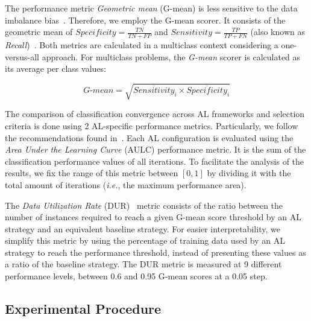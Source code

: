 \documentclass[remotesensing,article,submit,moreauthors,pdftex]{Definitions/mdpi}
\begin{document}
\begin{paracol}{2}
The performance metric \textit{Geometric mean} (G-mean) is less
sensitive to the data imbalance bias~\cite{Jeni2013, Kubat1997}. Therefore, we
employ the G-mean scorer. It consists of the geometric mean of $Specificity =
\frac{TN}{TN + FP}$ and $Sensitivity = \frac{TP}{TP+FN}$ (also known as
\textit{Recall})~\cite{Kubat1997}. Both metrics are calculated in a multiclass
context considering a one-versus-all approach. For multiclass problems, the
\textit{G-mean} scorer is calculated as its average per class values: 
        
\begin{equation*}
    \textit{G-mean} = \sqrt{\overline{Sensitivity}_i \times
    \overline{Specificity}_i}
\end{equation*}
    
The comparison of classification convergence across AL frameworks and
selection criteria is done using 2 AL-specific performance metrics.
Particularly, we follow the recommendations found in~\cite{Kottke2017}. Each
AL configuration is evaluated using the \textit{Area Under the Learning Curve}
(AULC) performance metric. It is the sum of the classification performance
values of all iterations. To facilitate the analysis of the results, we fix
the range of this metric between $[0,1]$ by dividing it with the total amount
of iterations (\textit{i.e.}, the maximum performance area). 

The \textit{Data Utilization Rate} (DUR)~\cite{Reitmaier2013} metric consists
of the ratio between the number of instances required to reach a given G-mean
score threshold by an AL strategy and an equivalent baseline strategy. For
easier interpretability, we simplify this metric by using the percentage
of training data used by an AL strategy to reach the performance threshold,
instead of presenting these values as a ratio of the baseline strategy. The
DUR metric is measured at 9 different performance levels, between
0.6 and 0.95 G-mean scores at a 0.05 step.

\subsection{Experimental Procedure}~\label{sec:experimental_procedure}


\end{paracol}
\end{document}
